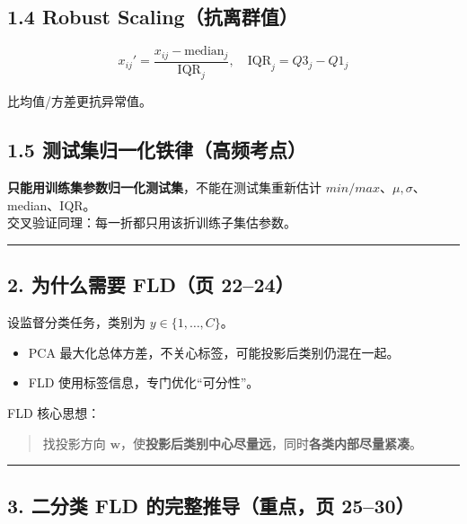 \subsection{1.4 Robust
Scaling（抗离群值）}\label{robust-scalingux6297ux79bbux7fa4ux503c}

\[
x_{ij}'=\frac{x_{ij}-\mathrm{median}_j}{\mathrm{IQR}_j},
\quad \mathrm{IQR}_j=Q3_j-Q1_j
\]

比均值/方差更抗异常值。

\subsection{1.5
测试集归一化铁律（高频考点）}\label{ux6d4bux8bd5ux96c6ux5f52ux4e00ux5316ux94c1ux5f8bux9ad8ux9891ux8003ux70b9}

\textbf{只能用训练集参数归一化测试集}，不能在测试集重新估计
\(min/max\)、\(\mu,\sigma\)、median、IQR。\\
交叉验证同理：每一折都只用该折训练子集估参数。

\begin{center}\rule{0.5\linewidth}{0.5pt}\end{center}

\subsection{2. 为什么需要 FLD（页
22--24）}\label{ux4e3aux4ec0ux4e48ux9700ux8981-fldux9875-2224}

设监督分类任务，类别为 \(y\in\{1,\dots,C\}\)。

\begin{itemize}
\tightlist
\item
  PCA 最大化总体方差，不关心标签，可能投影后类别仍混在一起。
\item
  FLD 使用标签信息，专门优化``可分性''。
\end{itemize}

FLD 核心思想：

\begin{quote}
找投影方向
\(\mathbf{w}\)，使\textbf{投影后类别中心尽量远}，同时\textbf{各类内部尽量紧凑}。
\end{quote}

\begin{center}\rule{0.5\linewidth}{0.5pt}\end{center}

\subsection{3. 二分类 FLD 的完整推导（重点，页
25--30）}\label{ux4e8cux5206ux7c7b-fld-ux7684ux5b8cux6574ux63a8ux5bfcux91cdux70b9ux9875-2530}

